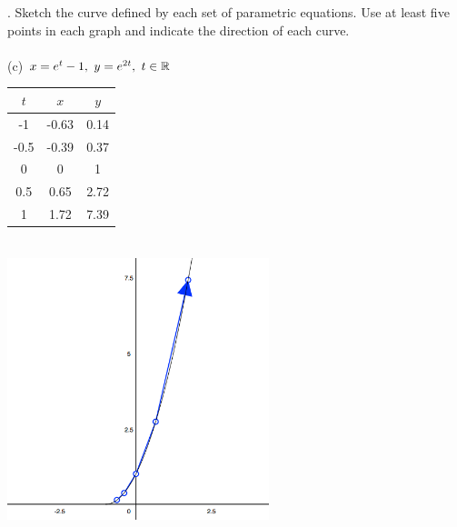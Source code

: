 \documentclass[11pt]{exam}
\begin{document}
. Sketch the curve defined by each set of parametric equations. Use at least five points in each graph and indicate the direction of each curve. \\
\\
\indent (c) $x = e^t - 1,\ y = e^{2t},\ t \in \Bbb{R} $\\
\newline
\newline
\def\arraystretch{1.5}
\begin{tabular}{ c|c|c }
  $t$ & $x$ & $y$ \\
  \hline
  -1   & -0.63 & 0.14 \\
  -0.5 & -0.39 & 0.37 \\
   0   &  0    & 1    \\
   0.5 &  0.65 & 2.72 \\
   1   &  1.72 & 7.39 \\
\end{tabular}\\
\includegraphics[width=3in]{g1c.png}
\end{document}
